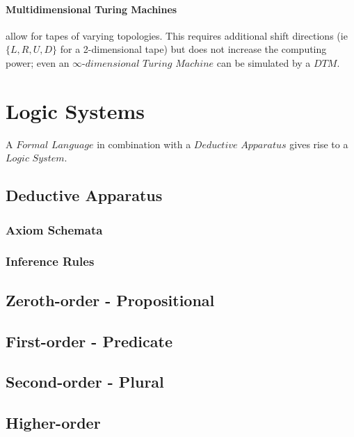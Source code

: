 \documentclass{article}
\begin{document}
\paragraph{Multidimensional Turing Machines} allow for tapes of
varying topologies. This requires additional shift directions (ie
$\{L, R, U, D\}$ for a 2-dimensional tape) but does not increase the
computing power; even an $\infty$-$dimensional$ $Turing$ $Machine$ can
be simulated by a $DTM$.


\section{Logic Systems}

A $Formal$ $Language$ in combination with a $Deductive$ $Apparatus$
gives rise to a $Logic$ $System$.

\subsection{Deductive Apparatus}

\subsubsection{Axiom Schemata}

\subsubsection{Inference Rules}

\subsection{Zeroth-order - Propositional}

\subsection{First-order - Predicate}

\subsection{Second-order - Plural}

\subsection{Higher-order}
\end{document}
